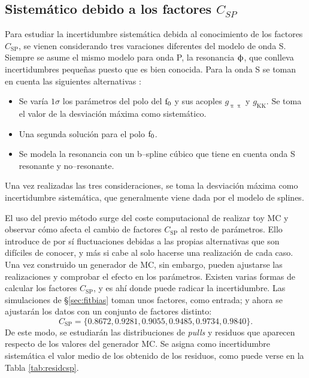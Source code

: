 \subsection{Sistemático debido a los factores $C_{SP}$}

Para estudiar la incertidumbre sistemática debida al conocimiento de los factores $C_{\text{SP}}$, se vienen considerando tres varaciones diferentes del modelo de onda S. Siempre se asume el mismo modelo para onda P, la resonancia $\upphi$, que conlleva incertidumbres pequeñas puesto que es bien conocida. Para la onda S se toman en cuenta las siguientes alternativas \cite{paperPhis}:
\begin{itemize}
  \item Se varía $1 \sigma$ los parámetros del polo del $\text{f}_0$ y sus acoples $g_{\uppi \uppi}$ y $g_{\text{KK}}$. Se toma el valor de la desviación máxima como sistemático.
  \item Una segunda solución para el polo $\text{f}_0$.
  \item Se modela la resonancia con un b--spline cúbico que tiene en cuenta onda S resonante y no--resonante.
\end{itemize}
Una vez realizadas las tres consideraciones, se toma la desviación máxima como incertidumbre sistemática, que generalmente viene dada por el modelo de splines.

El uso del previo método surge del coste computacional de realizar toy MC y observar cómo afecta el cambio de factores $C_{\text{SP}}$ al resto de parámetros. Ello introduce de por sí fluctuaciones debidas a las propias alternativas que son difíciles de conocer, y más si cabe al solo hacerse una realización de cada caso. Una vez construido un generador de MC, sin embargo, pueden ajustarse las realizaciones y comprobar el efecto en los parámetros.
Existen varias formas de calcular los factores $C_{\text{SP}}$, y es ahí donde puede radicar la incertidumbre. Las simulaciones de \S \ref{sec:fitbias} toman unos factores, como entrada; y ahora se ajustarán los datos con un conjunto de factores distinto:
\[C_{\text{SP}} = \{0.8672, 0.9281, 0.9055, 0.9485, 0.9734, 0.9840 \}.\]
De este modo, se estudiarán las distribuciones de \textit{pulls} y residuos que aparecen respecto de los valores del generador MC. Se asigna como incertidumbre sistemática el valor medio de los obtenido de los residuos, como puede verse en la Tabla \ref{tab:residcsp}.


